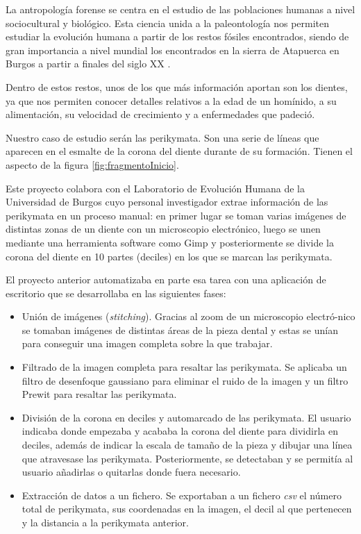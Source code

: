 \label{i:intro}

La antropología forense se centra en el estudio de las poblaciones humanas a nivel sociocultural y biológico. Esta ciencia unida a la paleontología nos permiten estudiar la evolución humana a partir de los restos fósiles encontrados, siendo de gran importancia a nivel mundial los encontrados en la sierra de Atapuerca en Burgos a partir a finales del siglo XX \cite{atapuercaYacimientos}.

Dentro de estos restos, unos de los que más información aportan son los dientes, ya que nos permiten conocer detalles relativos a la edad de un homínido, a su alimentación, su velocidad de crecimiento y a enfermedades que padeció.

Nuestro caso de estudio serán las perikymata. Son una serie de líneas que aparecen en el esmalte de la corona del diente durante de su formación. Tienen el aspecto de la figura \ref{fig:fragmentoInicio}.




Este proyecto colabora con el Laboratorio de Evolución Humana de la Universidad de Burgos cuyo personal investigador extrae información de las perikymata en un proceso manual: en primer lugar se toman varias imágenes de distintas zonas de un diente con un microscopio electrónico, luego se unen mediante una herramienta software como Gimp \cite{Gimp:online} y posteriormente se divide la corona del diente en 10 partes (deciles) en los que se marcan las perikymata.

\label{IntroduccionProyecto}
El proyecto anterior \cite{perikymataV1} automatizaba en parte esa tarea con una aplicación de escritorio que se desarrollaba en las siguientes fases: 
\begin{itemize}
    \item Unión de imágenes (\textit{stitching}). Gracias al zoom de un microscopio electró-nico se tomaban imágenes de distintas áreas de la pieza dental y estas se unían para conseguir una imagen completa sobre la que trabajar.
    \item Filtrado de la imagen completa para resaltar las perikymata. Se aplicaba un filtro de desenfoque gaussiano \cite{wiki:gaussianNoise} para eliminar el ruido de la imagen y un filtro Prewit \cite{wiki:Prewitt} para resaltar las perikymata.
    \item División de la corona en deciles y automarcado de las perikymata. El usuario indicaba donde empezaba y acababa la corona del diente para dividirla en deciles, además de indicar la escala de tamaño de la pieza y dibujar una línea que atravesase las perikymata. Posteriormente, se detectaban y se permitía al usuario añadirlas o quitarlas donde fuera necesario. 
    \item Extracción de datos a un fichero. Se exportaban a un fichero \textit{csv} el número total de perikymata, sus coordenadas en la imagen, el decil al que pertenecen y la distancia a la perikymata anterior.
\end{itemize}


